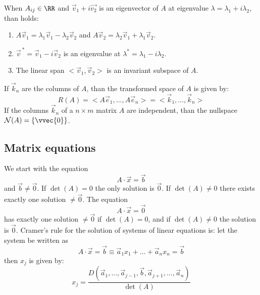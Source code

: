\npar
When $A_{ij}\in\RR$ and $\vec{v}_1+i\vec{v_2}$ is an eigenvector of $A$
at eigenvalue $\lambda=\lambda_1+i\lambda_2$, than holds:
\begin{enumerate}
	\item $A\vec{v}_1=\lambda_1\vec{v}_1-\lambda_2\vec{v}_2$ and $A\vec{v}_2=\lambda_2\vec{v}_1+\lambda_1\vec{v}_2$.
	\item $\vec{v}^{~*}=\vec{v}_1-i\vec{v}_2$ is an eigenvalue at $\lambda^*=\lambda_1-i\lambda_2$.
	\item The linear span $<\vec{v}_1,\vec{v}_2>$ is an invariant subspace of $A$.
\end{enumerate}
If $\vec{k}_n$ are the columns of $A$, than the transformed space of $A$ is
given by:
\[
R(A)=<A\vec{e}_1,...,A\vec{e}_n>=<\vec{k}_1,...,\vec{k}_n>
\]
If the columns $\vec{k}_n$ of a $n\times m$ matrix $A$ are independent, than
the nullspace ${\cal N}(A)=\{\vvec{0}\}$.

\subsection{Matrix equations}
We start with the equation
\[
A\cdot\vec{x}=\vec{b}
\]
and $\vec{b}\neq\vec{0}$. If $\det(A)=0$ the only solution is $\vec{0}$. If
$\det(A)\neq0$ there exists exactly one solution $\neq\vec{0}$.
\npar
The equation
\[
A\cdot\vec{x}=\vec{0}
\]
has exactly one solution $\neq\vec{0}$ if $\det(A)=0$, and if
$\det(A)\neq0$ the solution is $\vec{0}$.
\npar
Cramer's rule for the solution of systems of linear equations is: let the
system be written as
\[
A\cdot\vec{x}=\vec{b}\equiv\vec{a}_1x_1+...+\vec{a}_nx_n=\vec{b}
\]
then $x_j$ is given by:
\[
x_j=\frac{D(\vec{a}_1,...,\vec{a}_{j-1},\vec{b},\vec{a}_{j+1},...,\vec{a}_n)}{\det(A)}
\]

